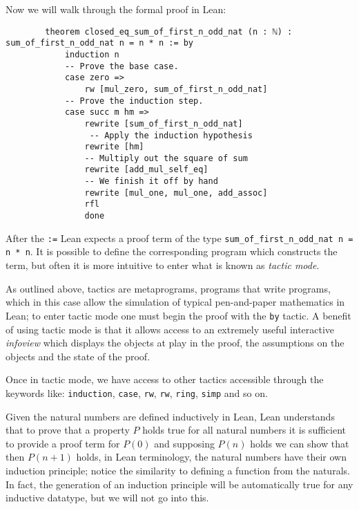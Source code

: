 \begin{example}
    Now we will walk through the formal proof in Lean:

    \begin{footnotesize}
    \begin{verbatim}
        theorem closed_eq_sum_of_first_n_odd_nat (n : ℕ) : sum_of_first_n_odd_nat n = n * n := by
            induction n
            -- Prove the base case.
            case zero =>
                rw [mul_zero, sum_of_first_n_odd_nat]
            -- Prove the induction step.
            case succ m hm =>
                rewrite [sum_of_first_n_odd_nat]
                 -- Apply the induction hypothesis
                rewrite [hm]
                -- Multiply out the square of sum
                rewrite [add_mul_self_eq]
                -- We finish it off by hand
                rewrite [mul_one, mul_one, add_assoc]
                rfl
                done
    \end{verbatim}
    \end{footnotesize}

    After the \texttt{:=} Lean expects a proof term of the type \texttt{sum\_of\_first\_n\_odd\_nat n = n * n}. It is possible to
    define the corresponding program which constructs the term, but often it is more intuitive to enter what is known as \textit{tactic mode}.

    As outlined above, tactics are metaprograms, programs that write programs, which in this case allow the simulation of typical pen-and-paper mathematics
    in Lean; to enter tactic mode one must begin the proof with the \texttt{by} tactic. A benefit of using tactic mode is that it allows access to an extremely useful
    interactive \textit{infoview} which displays the objects at play in the proof, the assumptions on the objects and the state of the proof.

    Once in tactic mode, we have access to other tactics accessible through the keywords like: \texttt{induction}, \texttt{case}, \texttt{rw}, \texttt{rw}, \texttt{ring}, \texttt{simp} and so on.
    
    Given the natural numbers are defined inductively in Lean, Lean understands that to prove that a property $P$ holds true for all natural numbers
    it is sufficient to provide a proof term for $P(0)$ and supposing $P(n)$ holds we can show that then $P(n+1)$ holds, in Lean terminology, the natural numbers
    have their own induction principle; notice the similarity to defining a function from the naturals. In fact, the generation of an induction principle 
    will be automatically true for any inductive datatype, but we will not go into this.
    

\end{example}
